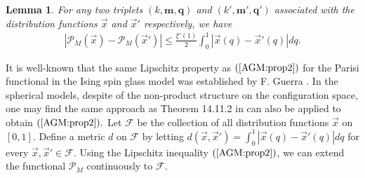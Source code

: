 \documentclass[12pt]{article}
\newcommand{\vx}{\vec{x}}
\newtheorem{lemma}{\bf Lemma}
\newenvironment{Proof of lemma}{\noindent{\bf Proof of Lemma}}{\hfill$\Box$\newline}
\newenvironment{Proof of theorem}{\noindent{\bf Proof of Theorem}}{\hfill{\footnotesize${\square}$}\newline}
\newenvironment{Proof of theorems}{\noindent{\bf Proof of Theorems}}{\hfill$\Box$\newline}
\newenvironment{Proof of proposition}{\noindent{\bf Proof of Proposition}}{\hfill$\Box$\newline}
\newenvironment{Proof of propositions}{\noindent{\bf Proof of Propositions}}{\hfill$\Box$\newline}
\newenvironment{Proof of exercise}{\noindent{\it Proof of Exercise:}}{\hfill$\Box$}
\numberwithin{equation}{section}
\begin{document}
\begin{lemma} \label{AGM:prop21}
For any two triplets $(k,\mathbf{m},\mathbf{q})$ and $(k',\mathbf{m}',\mathbf{q}')$ associated with the distribution functions $\vx$ and $\vx'$ respectively, we have
\begin{align}
\label{AGM:prop2}
\left|\mathcal{P}_M(\vx)-\mathcal{P}_M(\vx')\right|\leq \frac{\xi'(1)}{2}\int_0^1\left|\vx(q)-\vx'(q)\right|dq.
\end{align} 
\end{lemma}

\smallskip

\noindent 
It is well-known that the same Lipschitz property as $(\ref{AGM:prop2})$ for the Parisi functional in the Ising spin glass model was established by F. Guerra \cite{Guerra03}. In the spherical models, despite of the non-product structure on the configuration space, one may find the same approach as Theorem 14.11.2 in \cite{Tal11} can also be applied to obtain $(\ref{AGM:prop2}).$ Let $\mathcal{F}$ be the collection of all distribution functions $\vx$ on $\left[0,1\right]$. Define a metric $d$ on $\mathcal{F}$ by letting $d(\vx,\vx')=\int_0^1\left|\vx(q)-\vx'(q)\right|dq$ for every $\vx,\vx'\in \mathcal{F}.$ Using the Lipschitz inequality $(\ref{AGM:prop2})$, we can extend the functional $\mathcal{P}_M$ continuously to $\mathcal{F}.$

\smallskip
\end{document}
